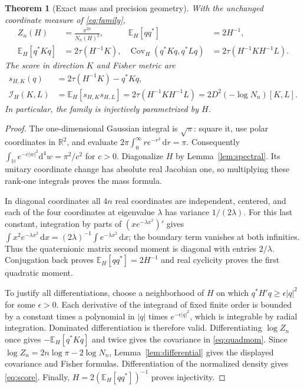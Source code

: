 \documentclass[11pt,a4paper]{article}
\numberwithin{equation}{section}
\newtheorem{theorem}{Theorem}[section]
\theoremstyle{definition}
\theoremstyle{remark}
\newcommand{\HH}{\mathbb H}
\newcommand{\RR}{\mathbb R}
\newcommand{\EE}{\mathbb E}
\newcommand{\Cov}{\operatorname{Cov}}
\newcommand{\dd}{\,\mathrm d}
\newcommand{\FI}{\mathcal I}
\newcommand{\rtr}{\tau}
\begin{document}
\begin{theorem}[Exact mass and precision geometry]\label{thm:gaussian}
With the unchanged coordinate measure of \eqref{eq:family},
\begin{align}
Z_n(H)&=\frac{\pi^{2n}}{N_n(H)^2}, &
\EE_H[qq^*]&=2H^{-1},\label{eq:massmom}\\
\EE_H[q^*Kq]&=2\rtr(H^{-1}K), &
\Cov_H(q^*Kq,q^*Lq)&=2\rtr(H^{-1}KH^{-1}L).\label{eq:quadmom}
\end{align}
The score in direction $K$ and Fisher metric are
\begin{align}
s_{H,K}(q)&=2\rtr(H^{-1}K)-q^*Kq,\label{eq:score}\\
\FI_H(K,L)&=\EE_H[s_{H,K}s_{H,L}]
=2\rtr(H^{-1}KH^{-1}L)
=2D^2(-\log N_n)[K,L].\label{eq:fisher}
\end{align}
In particular, the family is injectively parametrized by $H$.
\end{theorem}
\begin{proof}
The one-dimensional Gaussian integral is $\sqrt\pi$: square it, use
polar coordinates in $\RR^2$, and evaluate
$2\pi\int_0^\infty re^{-r^2}\dd r=\pi$.
Consequently $\int_{\HH}e^{-c|w|^2}\mathrm d^4w=\pi^2/c^2$ for $c>0$.
Diagonalize $H$ by Lemma~\ref{lem:spectral}. Its unitary coordinate
change has absolute real Jacobian one, so multiplying these rank-one
integrals proves the mass formula.

In diagonal coordinates all $4n$ real coordinates are independent,
centered, and each of the four coordinates at eigenvalue $\lambda$
has variance $1/(2\lambda)$. For this last constant, integration by parts
of $(xe^{-\lambda x^2})'$ gives
$\int x^2e^{-\lambda x^2}\dd x=(2\lambda)^{-1}\int e^{-\lambda x^2}\dd x$;
the boundary term vanishes at both infinities. Thus the quaternionic matrix second moment
is diagonal with entries $2/\lambda$. Conjugation back proves
$\EE_H[qq^*]=2H^{-1}$ and real cyclicity proves the first quadratic moment.

To justify all differentiations, choose a neighborhood of $H$ on which
$q^*H'q\ge\epsilon|q|^2$ for some $\epsilon>0$. Each derivative of
the integrand of fixed finite order is bounded by a constant times
a polynomial in $|q|$ times $e^{-\epsilon|q|^2}$, which is integrable
by radial integration. Dominated differentiation is therefore valid.
Differentiating $\log Z_n$ once gives $-\EE_H[q^*Kq]$ and twice gives
the covariance in \eqref{eq:quadmom}. Since
$\log Z_n=2n\log\pi-2\log N_n$, Lemma~\ref{lem:differential}
gives the displayed covariance and Fisher formulas. Differentiation of
the normalized density gives \eqref{eq:score}. Finally,
$H=2(\EE_H[qq^*])^{-1}$ proves injectivity.
\end{proof}
\end{document}
